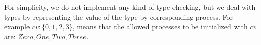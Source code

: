 For simplicity, we do not implement any kind of type checking, but we deal with types by representing the value of the type by corresponding process. For example $cv: \{0,1,2,3\}$, means that the allowed processes to be initialized with $cv$ are: $Zero, One, Two, Three$.